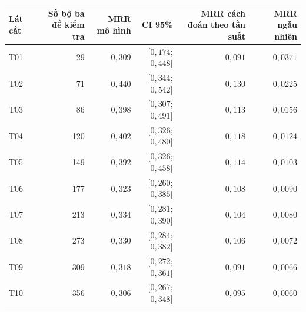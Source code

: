 \begin{tabular}{lrrrrr}
\toprule
Lát cắt & Số bộ ba để kiểm tra & MRR mô hình & CI 95\% & MRR cách đoán theo tần suất & MRR ngẫu nhiên \\
\midrule
T01 & 29 & $0{,}309$ & [$0{,}174$; $0{,}448$] & $0{,}091$ & $0{,}0371$ \\
T02 & 71 & $0{,}440$ & [$0{,}344$; $0{,}542$] & $0{,}130$ & $0{,}0225$ \\
T03 & 86 & $0{,}398$ & [$0{,}307$; $0{,}491$] & $0{,}113$ & $0{,}0156$ \\
T04 & 120 & $0{,}402$ & [$0{,}326$; $0{,}480$] & $0{,}118$ & $0{,}0124$ \\
T05 & 149 & $0{,}392$ & [$0{,}326$; $0{,}458$] & $0{,}114$ & $0{,}0103$ \\
T06 & 177 & $0{,}323$ & [$0{,}260$; $0{,}385$] & $0{,}108$ & $0{,}0090$ \\
T07 & 213 & $0{,}334$ & [$0{,}281$; $0{,}390$] & $0{,}104$ & $0{,}0080$ \\
T08 & 273 & $0{,}330$ & [$0{,}284$; $0{,}382$] & $0{,}106$ & $0{,}0072$ \\
T09 & 309 & $0{,}318$ & [$0{,}272$; $0{,}361$] & $0{,}091$ & $0{,}0066$ \\
T10 & 356 & $0{,}306$ & [$0{,}267$; $0{,}348$] & $0{,}095$ & $0{,}0060$ \\
\bottomrule
\end{tabular}

